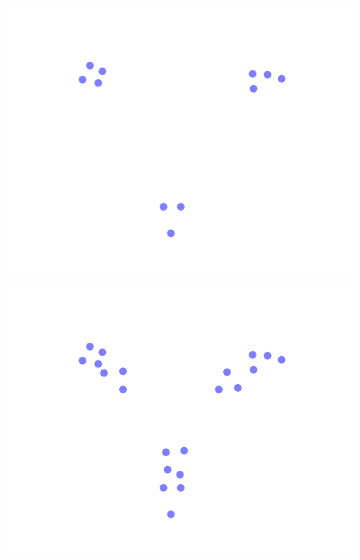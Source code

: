 \begin{figure}[ht]
  \begin{center}
    \begin{subfigure}[b]{.3\textwidth}
      \includegraphics[width=\textwidth]{gfx/functional_small.pdf}
    \end{subfigure}
    \begin{subfigure}[b]{.3\textwidth}
      \includegraphics[width=\textwidth]{gfx/functional_medium.pdf}
    \end{subfigure}
    \begin{subfigure}[b]{.3\textwidth}

\end{subfigure}
\end{center}
\end{figure}
